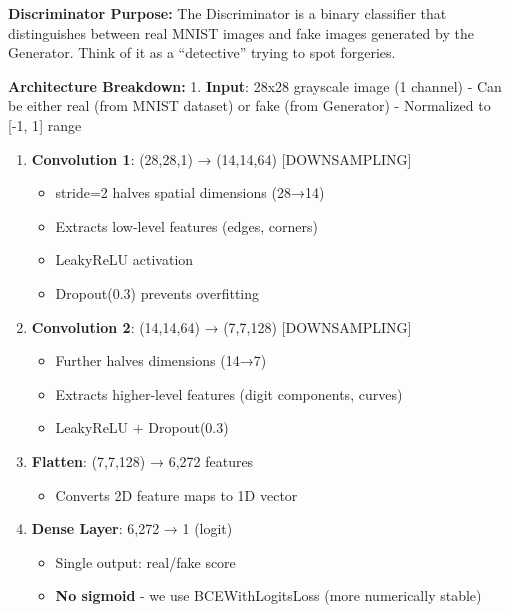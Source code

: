 \documentclass[11pt]{article}
\providecommand{\tightlist}{%
      \setlength{\itemsep}{0pt}\setlength{\parskip}{0pt}}
\begin{document}
\textbf{Discriminator Purpose:} The Discriminator is a binary classifier
that distinguishes between real MNIST images and fake images generated
by the Generator. Think of it as a ``detective'' trying to spot
forgeries.

\textbf{Architecture Breakdown:} 1. \textbf{Input}: 28x28 grayscale
image (1 channel) - Can be either real (from MNIST dataset) or fake
(from Generator) - Normalized to {[}-1, 1{]} range

\begin{enumerate}
\def\labelenumi{\arabic{enumi}.}
\setcounter{enumi}{1}
\tightlist
\item
  \textbf{Convolution 1}: (28,28,1) → (14,14,64) {[}DOWNSAMPLING{]}

  \begin{itemize}
  \tightlist
  \item
    stride=2 halves spatial dimensions (28→14)
  \item
    Extracts low-level features (edges, corners)
  \item
    LeakyReLU activation
  \item
    Dropout(0.3) prevents overfitting
  \end{itemize}
\item
  \textbf{Convolution 2}: (14,14,64) → (7,7,128) {[}DOWNSAMPLING{]}

  \begin{itemize}
  \tightlist
  \item
    Further halves dimensions (14→7)
  \item
    Extracts higher-level features (digit components, curves)
  \item
    LeakyReLU + Dropout(0.3)
  \end{itemize}
\item
  \textbf{Flatten}: (7,7,128) → 6,272 features

  \begin{itemize}
  \tightlist
  \item
    Converts 2D feature maps to 1D vector
  \end{itemize}
\item
  \textbf{Dense Layer}: 6,272 → 1 (logit)

  \begin{itemize}
  \tightlist
  \item
    Single output: real/fake score
  \item
    \textbf{No sigmoid} - we use BCEWithLogitsLoss (more numerically
    stable)
  \end{itemize}
\end{enumerate}
\end{document}
